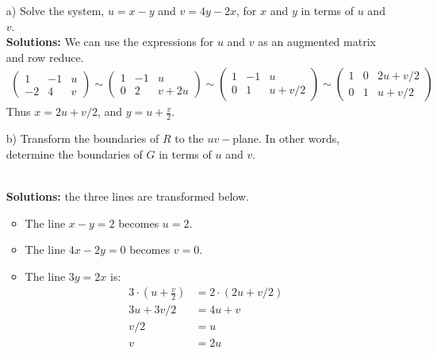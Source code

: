     \begin{enumerate}
        \item[a)] Solve the system, $u=x-y$ and $v=4y-2x$, for $x$ and $y$ in terms of $u$ and $v$.
            \ifnum {} {\color{DarkBlue} \\[12pt] 
            \textbf{Solutions:}
            We can use the expressions for $u$ and $v$ as an augmented matrix and row reduce. 
            \begin{align}
                \begin{pmatrix} 1 & -1 & u \\ -2 & 4 & v\end{pmatrix} 
                \sim \begin{pmatrix} 1 & -1 & u \\0 & 2 & v + 2u\end{pmatrix} 
                \sim \begin{pmatrix} 1 & -1 & u\\0 & 1 & u+v/2\end{pmatrix} 
                \sim \begin{pmatrix} 1 & 0 & 2u+v/2\\0 & 1 & u+v/2\end{pmatrix} 
            \end{align}
            Thus $x = 2u+v/2$, and $y = u + \frac{v}{2}$. 
            } 
            \else 
            \vspace{5cm}
            \fi
        \item[b)] Transform the boundaries of $R$ to the $uv-$plane. In other words, determine the boundaries of $G$ in terms of $u$ and $v$. 
            \ifnum {} {\color{DarkBlue} \\[12pt] 
            \textbf{Solutions:} the three lines are transformed below. 
            \begin{itemize}
                \item The line $x-y=2$ becomes $u=2$. 
                \item The line $4x-2y=0$ becomes $v=0$. 
                \item The line $3y=2x$ is: 
                \begin{align}
                    3\cdot \left(u+\frac{v}{2}\right) &= 2\cdot \left( 2u+v/2 \right) \\
                    3u + 3v/2 &= 4u + v \\
                    v/2 &= u \\
                    v &= 2u 
                \end{align}
            \end{itemize}
            } 
        \else 
        \vspace{5cm}
        \fi        
            

\end{enumerate}
